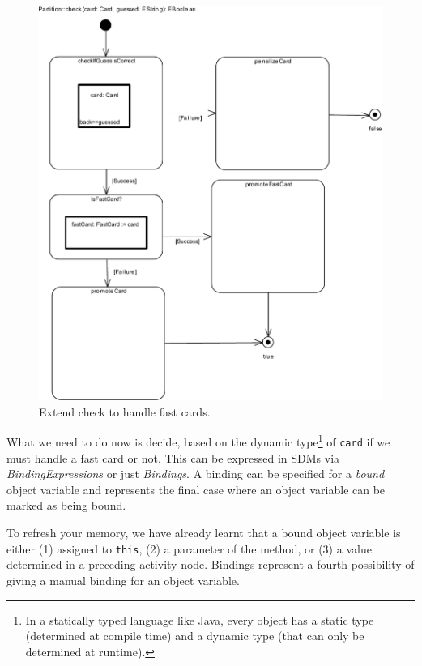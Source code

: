 \begin{figure}[htbp]
\begin{center}
  \includegraphics[width=\textwidth]{pics/sdmBilder/bindings/fastcard_controlflow.pdf}
  \caption{Extend check to handle fast cards.}  
  \label{fig:sdm_fastcard_2}
\end{center}
\end{figure}

What we need to do now is decide, based on the dynamic
type\footnote{In a statically typed language like Java, every object has a
static type (determined at compile time) and a dynamic type (that can only be
determined at runtime).} of \texttt{card} if we must handle a fast card or not.
This can be expressed in SDMs via \emph{BindingExpressions} or just
\emph{Bindings}.  A binding can be specified for a \emph{bound} object variable
and represents the final case where an object variable can be marked as being
bound.  

To refresh your memory, we have already learnt that a bound object
variable is either (1) assigned to \texttt{this}, (2) a parameter of the method,
or (3) a value determined in a preceding activity node.  Bindings represent a
fourth possibility of giving a manual binding for an object variable. 

